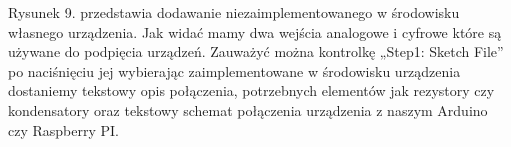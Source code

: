 \documentclass[12pt]{article} %
\begin{document}
Rysunek 9. przedstawia dodawanie niezaimplementowanego w środowisku własnego urządzenia. Jak widać mamy dwa wejścia analogowe i cyfrowe które są używane do podpięcia urządzeń. Zauważyć można kontrolkę „Step1: Sketch File” po naciśnięciu jej wybierając zaimplementowane w środowisku urządzenia dostaniemy tekstowy opis połączenia, potrzebnych elementów jak rezystory czy kondensatory oraz tekstowy schemat połączenia urządzenia z naszym Arduino czy Raspberry PI.
\end{document}
